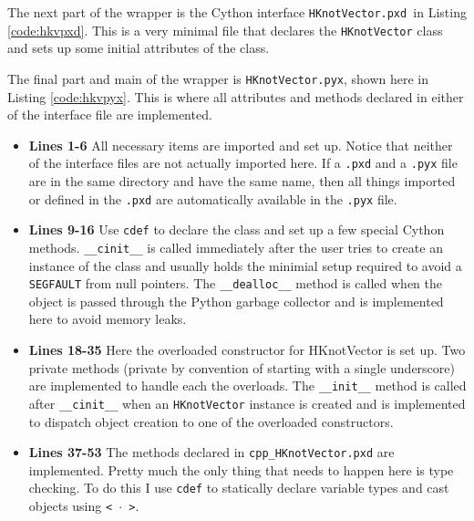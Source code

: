     
    \mainstretch{}

    \noindent The next part of the wrapper is the Cython interface \texttt{HKnotVector.pxd }in Listing \ref{code:hkvpxd}. This is a very minimal file that declares the \texttt{HKnotVector} class and sets up some initial attributes of the class.

    
    \mainstretch{}

    The final part and main of the wrapper is \texttt{HKnotVector.pyx}, shown here in Listing \ref{code:hkvpyx}. This is where all attributes and methods declared in either of the interface file are implemented.

    

    \begin{itemize}
      \item \textbf{Lines 1-6} All necessary items are imported and set up. Notice that neither of the interface files are not actually imported here. If a \texttt{.pxd} and a \texttt{.pyx} file are in the same directory and have the same name, then all things imported or defined in the \texttt{.pxd} are automatically available in the \texttt{.pyx} file.
      \item \textbf{Lines 9-16} Use \texttt{cdef} to declare the class and set up a few special Cython methods. \texttt{\_\_cinit\_\_} is called immediately after the user tries to create an instance of the class and usually holds the minimial setup required to avoid  a \texttt{SEGFAULT} from null pointers. The \texttt{\_\_dealloc\_\_} method is called when the object is passed through the Python garbage collector and is implemented here to avoid memory leaks.
      \item \textbf{Lines 18-35} Here the overloaded constructor for HKnotVector is set up. Two private methods (private by convention of starting with a single underscore) are implemented to handle each the overloads. The \texttt{\_\_init\_\_} method is called after \texttt{\_\_cinit\_\_} when an \texttt{HKnotVector} instance is created and is implemented to dispatch object creation to one of the overloaded constructors.
      \item \textbf{Lines 37-53} The methods declared in \texttt{cpp\_HKnotVector.pxd} are implemented. Pretty much the only thing that needs to happen here is type checking. To do this I use \texttt{cdef} to statically declare variable types and cast objects using \texttt{< $\cdot$ >}.
    \end{itemize}
    \mainstretch{}

